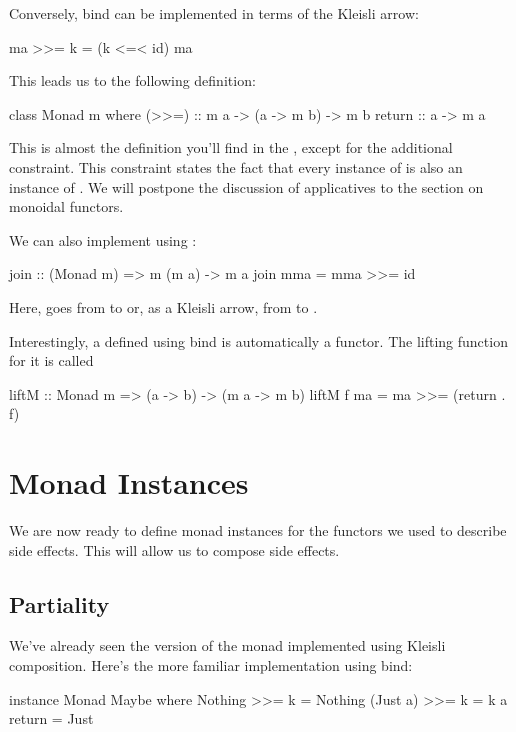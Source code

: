 \documentclass[DaoFP]{subfiles}
\begin{document}
Conversely, bind can be implemented in terms of the Kleisli arrow:
\begin{haskell}
ma >>= k = (k <=< id) ma
\end{haskell}

This leads us to the following definition:
\begin{haskell}
class Monad m where
  (>>=) :: m a -> (a -> m b) -> m b
  return :: a -> m a 
\end{haskell}
This is almost the definition you'll find in the , except for the additional constraint. This constraint states the fact that every instance of  is also an instance of . We will postpone the discussion of applicatives to the section on monoidal functors.

We can also implement  using \hask{>>=}:
\begin{haskell}
join  :: (Monad m) => m (m a) -> m a
join mma =  mma >>= id
\end{haskell}
Here,  goes from  to  or, as a Kleisli arrow, from   to .

Interestingly, a  defined using bind is automatically a functor. The lifting function for it is called 
\begin{haskell}
liftM :: Monad m => (a -> b) -> (m a -> m b)
liftM f ma = ma >>= (return . f)
\end{haskell}

\section{Monad Instances}

We are now ready to define monad instances for the functors we used to describe side effects. This will allow us to compose side effects.

\subsection{Partiality}
We've already seen the version of the  monad implemented using Kleisli composition. Here's the more familiar implementation using bind:
\begin{haskell}
instance Monad Maybe where
  Nothing >>= k = Nothing
  (Just a) >>= k = k a
  return = Just
\end{haskell}
\end{document}
